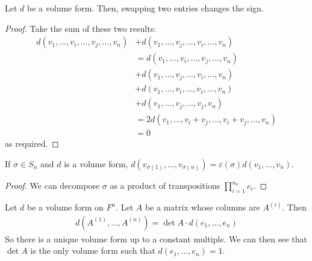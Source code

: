 \begin{lemma}
	Let $d$ be a volume form.
	Then, swapping two entries changes the sign.
\end{lemma}
\begin{proof}
	Take the sum of these two results:
	\begin{align*}
		d(v_1, \dots, v_i, \dots, v_j, \dots, v_n) & + d(v_1, \dots, v_j, \dots, v_i, \dots, v_n)               \\
		                                           & = d(v_1, \dots, v_i, \dots, v_j, \dots, v_n)               \\
		                                           & + d(v_1, \dots, v_j, \dots, v_i, \dots, v_n)               \\
		                                           & + d(v_1, \dots, v_i, \dots, v_i, \dots, v_n)               \\
		                                           & + d(v_1, \dots, v_j, \dots, v_j, v_n)                      \\
		                                           & = 2 d(v_1, \dots, v_i + v_j, \dots, v_i + v_j, \dots, v_n) \\
		                                           & = 0
	\end{align*}
	as required.
\end{proof}
\begin{corollary}
	If $\sigma \in S_n$ and $d$ is a volume form, $d(v_{\sigma(1)}, \dots, v_{\sigma(n)}) = \varepsilon(\sigma) d(v_1, \dots, v_n)$.
\end{corollary}
\begin{proof}
	We can decompose $\sigma$ as a product of transpositions $\prod_{i=1}^{n_\sigma} e_i$.
\end{proof}
\begin{theorem}
	Let $d$ be a volume form on $F^n$.
	Let $A$ be a matrix whose columns are $A^{(i)}$.
	Then
	\begin{align*}
		d(A^{(1)}, \dots, A^{(n)}) = \det A \cdot d(e_1, \dots, e_n)
	\end{align*}
	So there is a unique volume form up to a constant multiple.
	We can then see that $\det A$ is the only volume form such that $d(e_1, \dots, e_n) = 1$.
\end{theorem}
